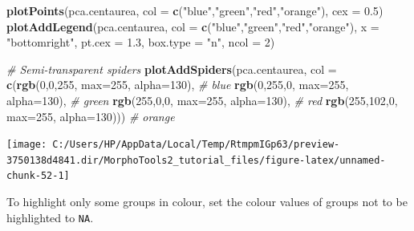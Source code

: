 \documentclass[
]{article}
\newenvironment{Shaded}{\begin{snugshade}}{\end{snugshade}}
\newcommand{\CommentTok}[1]{\textcolor[rgb]{0.56,0.35,0.01}{\textit{#1}}}
\newcommand{\DataTypeTok}[1]{\textcolor[rgb]{0.13,0.29,0.53}{#1}}
\newcommand{\DecValTok}[1]{\textcolor[rgb]{0.00,0.00,0.81}{#1}}
\newcommand{\FloatTok}[1]{\textcolor[rgb]{0.00,0.00,0.81}{#1}}
\newcommand{\KeywordTok}[1]{\textcolor[rgb]{0.13,0.29,0.53}{\textbf{#1}}}
\newcommand{\NormalTok}[1]{#1}
\newcommand{\StringTok}[1]{\textcolor[rgb]{0.31,0.60,0.02}{#1}}
\begin{document}
\begin{Shaded}
\begin{Highlighting}[]
\KeywordTok{plotPoints}\NormalTok{(pca.centaurea, }\DataTypeTok{col =} \KeywordTok{c}\NormalTok{(}\StringTok{"blue"}\NormalTok{,}\StringTok{"green"}\NormalTok{,}\StringTok{"red"}\NormalTok{,}\StringTok{"orange"}\NormalTok{), }\DataTypeTok{cex =} \FloatTok{0.5}\NormalTok{)}
\KeywordTok{plotAddLegend}\NormalTok{(pca.centaurea, }\DataTypeTok{col =} \KeywordTok{c}\NormalTok{(}\StringTok{"blue"}\NormalTok{,}\StringTok{"green"}\NormalTok{,}\StringTok{"red"}\NormalTok{,}\StringTok{"orange"}\NormalTok{), }
               \DataTypeTok{x =} \StringTok{"bottomright"}\NormalTok{, }\DataTypeTok{pt.cex =} \FloatTok{1.3}\NormalTok{, }\DataTypeTok{box.type =} \StringTok{"n"}\NormalTok{, }\DataTypeTok{ncol =} \DecValTok{2}\NormalTok{)}

\CommentTok{# Semi-transparent spiders}
\KeywordTok{plotAddSpiders}\NormalTok{(pca.centaurea, }\DataTypeTok{col =} \KeywordTok{c}\NormalTok{(}\KeywordTok{rgb}\NormalTok{(}\DecValTok{0}\NormalTok{,}\DecValTok{0}\NormalTok{,}\DecValTok{255}\NormalTok{, }\DataTypeTok{max=}\DecValTok{255}\NormalTok{, }\DataTypeTok{alpha=}\DecValTok{130}\NormalTok{), }\CommentTok{# blue}
                                      \KeywordTok{rgb}\NormalTok{(}\DecValTok{0}\NormalTok{,}\DecValTok{255}\NormalTok{,}\DecValTok{0}\NormalTok{, }\DataTypeTok{max=}\DecValTok{255}\NormalTok{, }\DataTypeTok{alpha=}\DecValTok{130}\NormalTok{), }\CommentTok{# green}
                                      \KeywordTok{rgb}\NormalTok{(}\DecValTok{255}\NormalTok{,}\DecValTok{0}\NormalTok{,}\DecValTok{0}\NormalTok{, }\DataTypeTok{max=}\DecValTok{255}\NormalTok{, }\DataTypeTok{alpha=}\DecValTok{130}\NormalTok{), }\CommentTok{# red}
                                      \KeywordTok{rgb}\NormalTok{(}\DecValTok{255}\NormalTok{,}\DecValTok{102}\NormalTok{,}\DecValTok{0}\NormalTok{, }\DataTypeTok{max=}\DecValTok{255}\NormalTok{, }\DataTypeTok{alpha=}\DecValTok{130}\NormalTok{))) }\CommentTok{# orange}
\end{Highlighting}
\end{Shaded}

\begin{center}\texttt{[image: C:/Users/HP/AppData/Local/Temp/RtmpmIGp63/preview-3750138d4841.dir/MorphoTools2\_tutorial\_files/figure-latex/unnamed-chunk-52-1]} \end{center}

To highlight only some groups in colour, set the colour values of groups
not to be highlighted to \texttt{NA}.
\end{document}
